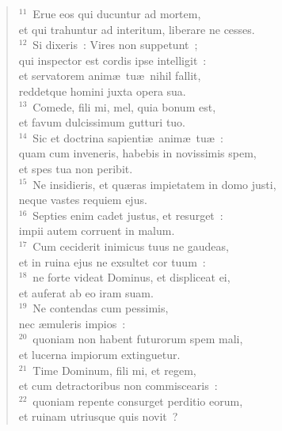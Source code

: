 \begin{flushleft}\begin{verse}${}^{11}$~Erue eos qui ducuntur ad mortem,\\ et qui trahuntur ad interitum, liberare ne cesses.\\
${}^{12}$~Si dixeris~: Vires non suppetunt~;\\ qui inspector est cordis ipse intelligit~:\\ et servatorem anim\ae\ tu\ae\ nihil fallit,\\ reddetque homini juxta opera sua.\\
${}^{13}$~Comede, fili mi, mel, quia bonum est,\\ et favum dulcissimum gutturi tuo.\\
${}^{14}$~Sic et doctrina sapienti\ae\ anim\ae\ tu\ae~:\\ quam cum inveneris, habebis in novissimis spem,\\ et spes tua non peribit.\\
${}^{15}$~Ne insidieris, et qu\ae ras impietatem in domo justi,\\ neque vastes requiem ejus.\\
${}^{16}$~Septies enim cadet justus, et resurget~:\\ impii autem corruent in malum.\\
${}^{17}$~Cum ceciderit inimicus tuus ne gaudeas,\\ et in ruina ejus ne exsultet cor tuum~:\\
${}^{18}$~ne forte videat Dominus, et displiceat ei,\\ et auferat ab eo iram suam.\\
${}^{19}$~Ne contendas cum pessimis,\\ nec \ae muleris impios~:\\
${}^{20}$~quoniam non habent futurorum spem mali,\\ et lucerna impiorum extinguetur.\\
${}^{21}$~Time Dominum, fili mi, et regem,\\ et cum detractoribus non commiscearis~:\\
${}^{22}$~quoniam repente consurget perditio eorum,\\ et ruinam utriusque quis novit~?\end{verse}\end{flushleft}


